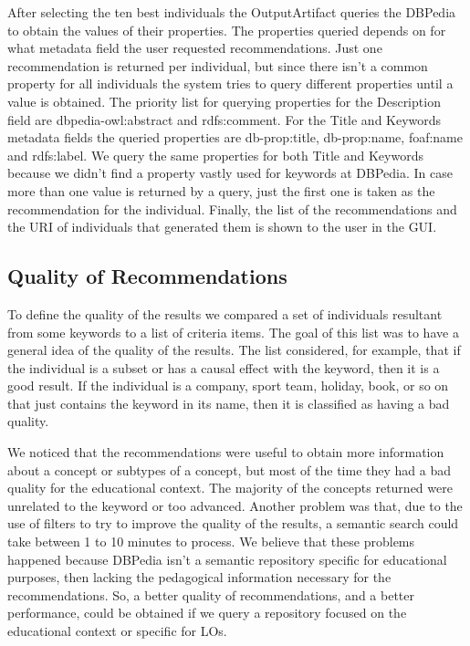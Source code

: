 \documentclass[a4paper,twoside]{article}
\begin{document}
After selecting the ten best individuals the OutputArtifact queries the DBPedia to obtain the values of their properties. The properties queried depends on for what metadata field the user requested recommendations. Just one recommendation is returned per individual, but since there isn't a common property for all individuals the system tries to query different properties until a value is obtained. The priority list for querying properties for the Description field are dbpedia-owl:abstract and rdfs:comment. For the Title and Keywords metadata fields the queried properties are db-prop:title, db-prop:name, foaf:name and rdfs:label. We query the same properties for both Title and Keywords because we didn't find a property vastly used for keywords at DBPedia. In case more than one value is returned by a query, just the first one is taken as the recommendation for the individual. Finally, the list of the recommendations and the URI of individuals that generated them is shown to the user in the GUI.

\subsection{Quality of Recommendations}

\noindent To define the quality of the results we compared a set of individuals resultant from some keywords to a list of criteria items. The goal of this list was to have a general idea of the quality of the results. The list considered, for example, that if the individual is a subset or has a causal effect with the keyword, then it is a good result. If the individual is a company, sport team, holiday, book, or so on that just contains the keyword in its name, then it is classified as having a bad quality.

We noticed that the recommendations were useful to obtain more information about a concept or subtypes of a concept, but most of the time they had a bad quality for the educational context. The majority of the concepts returned were unrelated to the keyword or too advanced. Another problem was that, due to the use of filters to try to improve the quality of the results, a semantic search could take between 1 to 10 minutes to process. We believe that these problems happened because DBPedia isn't a semantic repository specific for educational purposes, then lacking the pedagogical information necessary for the recommendations. So, a better quality of recommendations, and a better performance, could be obtained if we query a repository focused on the educational context or specific for LOs.
\end{document}
